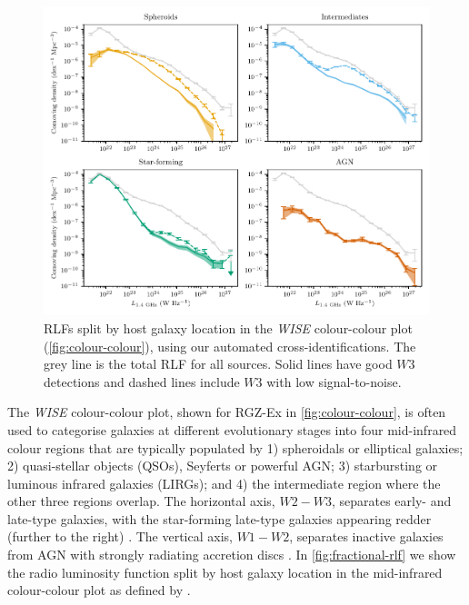   \begin{figure}
      \centering
    \includegraphics{rlf-images/frlf-ir-colours.pdf}
    \caption{RLFs split by host galaxy
      location in the \emph{WISE} colour-colour plot (\autoref{fig:colour-colour}),
      using our automated cross-identifications. The grey line is the
      total RLF for all sources. Solid lines have good $W3$ detections and dashed lines include $W3$ with low signal-to-noise.
    \label{fig:fractional-rlf}}
  \end{figure}

      The \emph{WISE} colour-colour plot, shown for RGZ-Ex in
      \autoref{fig:colour-colour}, is often used to categorise galaxies at different evolutionary stages into
      four mid-infrared colour regions that are typically populated by 1)
      spheroidals or elliptical galaxies; 2) quasi-stellar objects (QSOs),
      Seyferts or powerful AGN; 3) starbursting or luminous infrared galaxies
      (LIRGs); and 4) the intermediate region where the other three regions
      overlap. The horizontal axis, $W2-W3$, separates early- and late-type galaxies, with the star-forming late-type galaxies appearing redder (further to the right) \citep{wright10wise}. The vertical axis, $W1-W2$, separates inactive galaxies from AGN
      with strongly radiating accretion discs \citep{sadler14radio}. In
      \autoref{fig:fractional-rlf} we show the radio luminosity function split
      by host galaxy location in the mid-infrared colour-colour plot as defined by \citet{jarrett17wise}.

